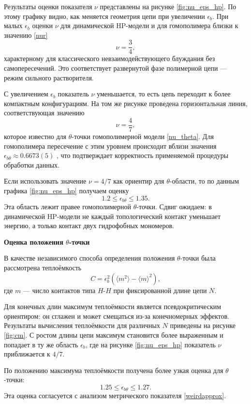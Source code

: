  
Результаты оценки показателя $\nu$ представлены на рисунке \ref{fig:nu_eps_hp}. 
По этому графику видно, как меняется геометрия цепи при увеличении $\epsilon_b$. 
При малых $\epsilon_b$ оценки $\nu$ для динамической HP-модели и для гомополимера близки к значению \eqref{nur}
 \[
 \nu=\frac{3}{4},
 \]
 характерному для классического невзаимодействующего блуждания без самопересечений. 
 Это  соответствует развернутой фазе полимерной цепи  --- режим сильного растворителя.
  
 С увеличением $\epsilon_b$ показатель $\nu$ уменьшается, то есть цепь переходит к более компактным конфигурациям.
  На том же рисунке проведена горизонтальная линия, соответствующая значению
  \[
  \nu=\frac{4}{7},
  \]
  которое известно для $\theta$-точки гомополимерной модели \eqref{nu_theta}.
   Для гомополимера пересечение с этим уровнем происходит вблизи   значения $\epsilon_{b\theta}\approx 0.6673(5)$ \cite{Caracciolo_2011}, что подтверждает корректность применяемой процедуры обработки данных.
  
 Если использовать значение $\nu=4/7$ как ориентир для $\theta$-области, то по данным графика \ref{fig:nu_eps_hp} получаем оценку
 \begin{equation}
 	\label{weirdapprox}
 	1.2 \le \epsilon_{b\theta} \le 1.35.
 \end{equation}
 Эта область лежит правее гомополимерной $\theta$-точки. 
 Сдвиг ожидаем: в динамической HP-модели не каждый топологический контакт уменьшает энергию, а только контакт двух гидрофобных мономеров.
  
  \textbf{Оценка положения $\theta$-точки}
  
  В качестве независимого способа определения положения $\theta$-точки была рассмотрена теплоёмкость
  \begin{equation}
  	C=\epsilon_b^2\left(\langle m^2\rangle-\langle m\rangle^2\right),
  	\label{eq:heat_rus}
  \end{equation}
  где $m$ --- число контактов типа $H$-$H$ при фиксированной длине цепи $N$.
  
	  Для конечных длин максимум теплоёмкости является псевдокритическим ориентиром: он сглажен и может смещаться из-за конечномерных эффектов. 
	  Результаты вычисления теплоёмкости для различных $N$ приведены на рисунке \ref{fig:cm}. 
	  С ростом длины цепи максимум становится более выраженным и попадает в ту же область $\epsilon_b$, где на рисунке \ref{fig:nu_eps_hp} показатель $\nu$ приближается к $4/7$.
  
  По положению максимума теплоёмкости получена более узкая оценка для $\theta$-точки:
  \begin{equation}
  	1.25 \le \epsilon_{b\theta} \le 1.27.
  \end{equation}
  Эта оценка согласуется с анализом метрического показателя  \eqref{weirdapprox}.
  
